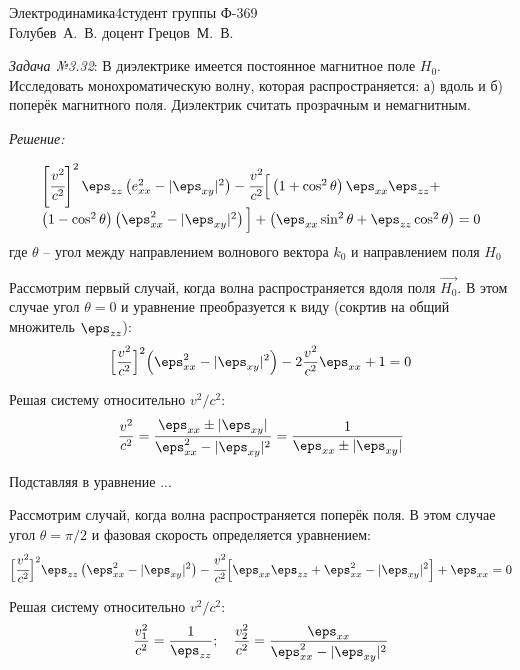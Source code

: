 




\usepackage{wrapfig}


{Электродинамика}{4}{}{студент группы Ф-369\\Голубев~А.~В.}
{}{доцент Грецов~М.~В.}{}{}

\newpage
\emph{Задача №3.32}: В диэлектрике имеется постоянное магнитное поле 
\( H_0 \). Исследовать монохроматическую волну, которая распространяется:
а) вдоль и б) поперёк магнитного поля. Диэлектрик считать прозрачным и 
немагнитным. 

\emph{Решение:}

\[
	\begin{array}{ll}
	\left[\cfrac{v^2}{c^2}\right]^2 \eps_{zz}\left( e^2_{xx} - 
		\vert \eps_{xy} \vert^2 \right) - \cfrac{v^2}{c^2}
		\Big[ \left( 1 + \cos^2\theta \right) \eps_{xx}\eps_{zz} + \\
		\left( 1 - \cos^2\theta \right) \left( \eps^2_{xx} - 
		\vert\eps_{xy}\vert^2 \right)\Big] + \left( \eps_{xx}\sin^2\theta + 
		\eps_{zz}\cos^2\theta \right) = 0
	\end{array}
\]
где \( \theta \) -- угол между направлением волнового вектора \( k_0 \) 
и направлением поля \( H_0 \)

Рассмотрим первый случай, когда волна распространяется вдоля поля 
\( \vec{H_0} \). В этом случае угол \( \theta = 0 \) и уравнение преобразуется 
к виду (сокртив на общий множитель \( \eps_{zz} \)):
\[
	\Big[ \frac{v^2}{c^2} \Big]^2 \Big( \eps^2_{xx} - 
		\vert\eps_{xy}\vert^2 \Big) - 2\frac{v^2}{c^2}\eps_{xx} + 1 = 0
\] 

Решая систему относительно \( v^2 / c^2 \):
\[
	\frac{v^2}{c^2} = \frac{\eps_{xx} \pm \vert \eps_{xy} \vert}
		{\eps^2_{xx} - \vert\eps_{xy}\vert^2} = 
		\frac{1}{\eps_{xx} \pm \vert\eps_{xy}\vert}
\]

Подставляя в уравнение ...

Рассмотрим случай, когда волна распространяется поперёк поля. В этом случае 
угол \( \theta = \pi / 2 \) и фазовая скорость определяется уравнением:
\[
	\Big[ \cfrac{v^2}{c^2} \Big]^2 \eps_{zz}\left( \eps^2_{xx} - 
		\vert\eps_{xy}\vert^2 \right) - \cfrac{v^2}{c^2}
		\Big[ \eps_{xx}\eps_{zz} + \eps^2_{xx} - 
		\vert\eps_{xy}\vert^2\Big] + \eps_{xx} = 0
\]

Решая систему относительно \( v^2 / c^2 \):
\[
	\frac{v^2_1}{c^2} = \frac{1}{\eps_{zz}};\quad
	\frac{v^2_2}{c^2} = \frac{\eps_{xx}}{\eps^2_{xx} - 
		\vert\eps_{xy}\vert^2}
\]

